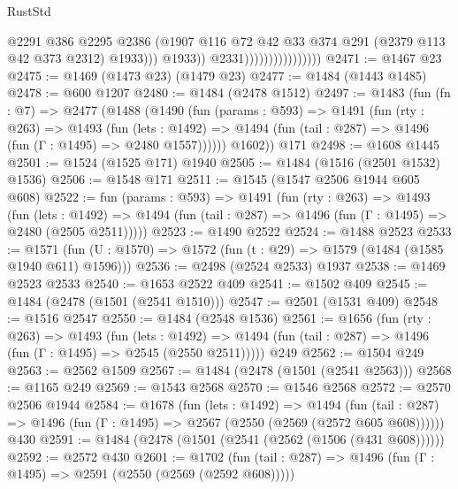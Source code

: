\begin{lexlean}{RustStd}
\begin{coremodule}
                                            @2291
                                            @386
                                            @2295
                                            @2386
                                            (@1907
                                              @116
                                              @72
                                              @42
                                              @33
                                              @374
                                              @291
                                              (@2379 @113 @42 @373 @2312)
                                              @1933)))
                                        @1933))
                                    @2331))))))))))))))))
@2471 := @1467 @23
@2475 := @1469 (@1473 @23) (@1479 @23)
@2477 := @1484 (@1443 @1485)
@2478 := @600 @1207
@2480 := @1484 (@2478 @1512)
@2497 := @1483
    (fun (fn : @7) =>
    @2477
      (@1488
        (@1490
          (fun (params : @593) =>
          @1491
            (fun (rty : @263) =>
            @1493
              (fun (lets : @1492) =>
              @1494 (fun (tail : @287) => @1496 (fun (Γ : @1495) => @2480 @1557))))))
        @1602))
    @171
@2498 := @1608 @1445
@2501 := @1524 (@1525 @171) @1940
@2505 := @1484 (@1516 (@2501 @1532) @1536)
@2506 := @1548 @171
@2511 := @1545 (@1547 @2506 @1944 @605 @608)
@2522 := fun (params : @593) =>
  @1491
    (fun (rty : @263) =>
    @1493
      (fun (lets : @1492) =>
      @1494 (fun (tail : @287) => @1496 (fun (Γ : @1495) => @2480 (@2505 @2511)))))
@2523 := @1490 @2522
@2524 := @1488 @2523
@2533 := @1571 (fun (U : @1570) => @1572 (fun (t : @29) => @1579 (@1484 (@1585 @1940 @611) @1596)))
@2536 := @2498 (@2524 @2533) @1937
@2538 := @1469 @2523 @2533
@2540 := @1653 @2522 @409
@2541 := @1502 @409
@2545 := @1484 (@2478 (@1501 (@2541 @1510)))
@2547 := @2501 (@1531 @409)
@2548 := @1516 @2547
@2550 := @1484 (@2548 @1536)
@2561 := @1656
    (fun (rty : @263) =>
    @1493
      (fun (lets : @1492) =>
      @1494 (fun (tail : @287) => @1496 (fun (Γ : @1495) => @2545 (@2550 @2511)))))
    @249
@2562 := @1504 @249
@2563 := @2562 @1509
@2567 := @1484 (@2478 (@1501 (@2541 @2563)))
@2568 := @1165 @249
@2569 := @1543 @2568
@2570 := @1546 @2568
@2572 := @2570 @2506 @1944
@2584 := @1678
    (fun (lets : @1492) =>
    @1494 (fun (tail : @287) => @1496 (fun (Γ : @1495) => @2567 (@2550 (@2569 (@2572 @605 @608))))))
    @430
@2591 := @1484 (@2478 (@1501 (@2541 (@2562 (@1506 (@431 @608))))))
@2592 := @2572 @430
@2601 := @1702
    (fun (tail : @287) => @1496 (fun (Γ : @1495) => @2591 (@2550 (@2569 (@2592 @608)))))

\end{coremodule}
\end{lexlean}
